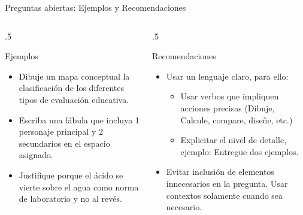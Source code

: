 \documentclass[11pt, aspectratio=169, xcolor=table,hyphens]{beamer}
\begin{document}
\begin{frame}{Preguntas abiertas: Ejemplos y Recomendaciones}
	\begin{columns}
		\begin{column}{.5\linewidth}
			\begin{exampleblock}{Ejemplos}
				\begin{itemize}
					\item Dibuje un mapa conceptual la clasificación de los diferentes tipos de evaluación educativa.
					\item Escriba una fábula que incluya 1 personaje principal y 2 secundarios en el espacio asignado.
					\item Justifique porque el ácido se vierte sobre el agua como norma de laboratorio y no al revés.
				\end{itemize}
			\end{exampleblock}
		\end{column}
		\begin{column}{.5\linewidth}
			\begin{block}{Recomendaciones}
				\begin{itemize}
					\item Usar un lenguaje claro, para ello:
					      \begin{itemize}
						      \item Usar verbos que impliquen acciones precisas (Dibuje, Calcule, compare, diseñe, etc.)
						      \item Explicitar el nivel de detalle, ejemplo: Entregue dos ejemplos.
					      \end{itemize}
					\item Evitar inclusión de elementos innecesarios en la pregunta. Usar contextos solamente cuando sea necesario.
				\end{itemize}
			\end{block}
		\end{column}
	\end{columns}
\end{frame}
\end{document}
